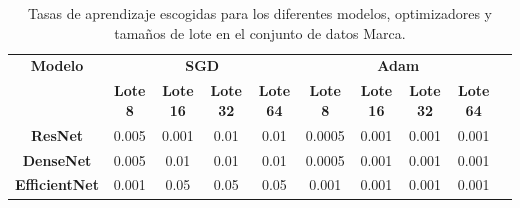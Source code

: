 \begin{table}[H]
	\centering
	\begin{adjustbox}
		{max width=\textwidth}
		\begin{tabular}{|c|c|c|c|c|c|c|c|c|c|}
			\hline
			\textbf{Modelo}       & \multicolumn{4}{c|}{\textbf{SGD}} & \multicolumn{4}{c|}{\textbf{Adam}} \\
			\cline{2-9}           & \textbf{Lote 8}                   & \textbf{Lote 16}                  & \textbf{Lote 32} & \textbf{Lote 64} & \textbf{Lote 8} & \textbf{Lote 16} & \textbf{Lote 32} & \textbf{Lote 64} \\
			\hline
			\textbf{ResNet}       & 0.005                             & 0.001                             & 0.01             & 0.01             & 0.0005          & 0.001            & 0.001            & 0.001            \\
			\hline
			\textbf{DenseNet}     & 0.005                             & 0.01                              & 0.01             & 0.01             & 0.0005          & 0.001            & 0.001            & 0.001            \\
			\hline
			\textbf{EfficientNet} & 0.001                             & 0.05                              & 0.05             & 0.05             & 0.001           & 0.001            & 0.001            & 0.001            \\
			\hline
		\end{tabular}
	\end{adjustbox}
	\caption{Tasas de aprendizaje escogidas para los diferentes modelos, optimizadores
		y tamaños de lote en el conjunto de datos Marca.}
	\label{tab:bs-optim-marca}
\end{table}

